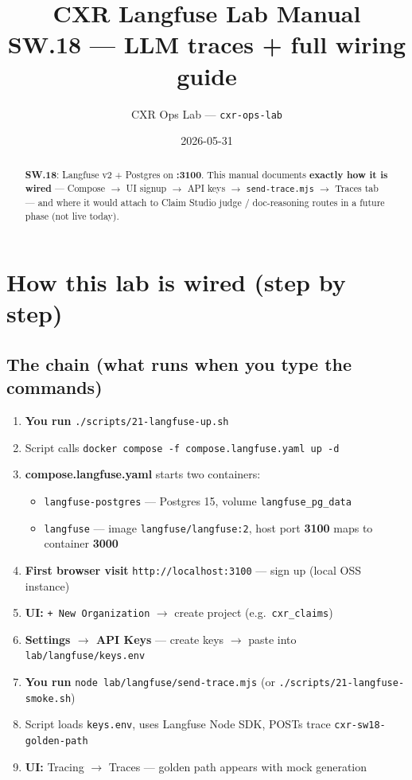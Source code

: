 \documentclass[11pt,a4paper]{report}
\title{CXR Langfuse Lab Manual\\
\large SW.18 --- LLM traces + full wiring guide}
\author{CXR Ops Lab --- \texttt{cxr-ops-lab}}
\date{2026-05-31}
\begin{document}
\maketitle
\begin{abstract}
\textbf{SW.18}: Langfuse v2 + Postgres on \textbf{:3100}. This manual documents \textbf{exactly how it is wired} ---
Compose $\rightarrow$ UI signup $\rightarrow$ API keys $\rightarrow$ \texttt{send-trace.mjs} $\rightarrow$ Traces tab ---
and where it would attach to Claim Studio judge / doc-reasoning routes in a future phase (not live today).
\end{abstract}
\tableofcontents
\newpage

\chapter{How this lab is wired (step by step)}

\section{The chain (what runs when you type the commands)}

\begin{enumerate}
  \item \textbf{You run} \texttt{./scripts/21-langfuse-up.sh}
  \item Script calls \texttt{docker compose -f compose.langfuse.yaml up -d}
  \item \textbf{compose.langfuse.yaml} starts two containers:
    \begin{itemize}
      \item \texttt{langfuse-postgres} --- Postgres 15, volume \texttt{langfuse\_pg\_data}
      \item \texttt{langfuse} --- image \texttt{langfuse/langfuse:2}, host port \textbf{3100} maps to container \textbf{3000}
    \end{itemize}
  \item \textbf{First browser visit} \texttt{http://localhost:3100} --- sign up (local OSS instance)
  \item \textbf{UI:} \texttt{+ New Organization} $\rightarrow$ create project (e.g.\ \texttt{cxr\_claims})
  \item \textbf{Settings $\rightarrow$ API Keys} --- create keys $\rightarrow$ paste into \texttt{lab/langfuse/keys.env}
  \item \textbf{You run} \texttt{node lab/langfuse/send-trace.mjs} (or \texttt{./scripts/21-langfuse-smoke.sh})
  \item Script loads \texttt{keys.env}, uses Langfuse Node SDK, POSTs trace \texttt{cxr-sw18-golden-path}
  \item \textbf{UI:} Tracing $\rightarrow$ Traces --- golden path appears with mock generation
\end{enumerate}
\end{document}
